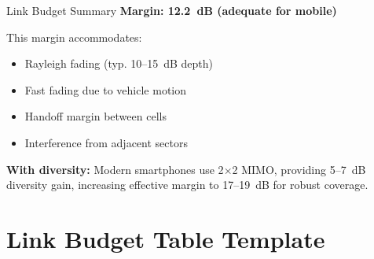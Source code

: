 \begin{calloutbox}[colback=green!10,colframe=green!50!black]{Link Budget Summary}
\textbf{Margin: 12.2~dB (adequate for mobile)}

This margin accommodates:
\begin{itemize}
\item Rayleigh fading (typ. 10--15~dB depth)
\item Fast fading due to vehicle motion
\item Handoff margin between cells
\item Interference from adjacent sectors
\end{itemize}

\textbf{With diversity:} Modern smartphones use 2$\times$2 MIMO, providing 5--7~dB diversity gain, increasing effective margin to 17--19~dB for robust coverage.
\end{calloutbox}

\section{Link Budget Table Template}

